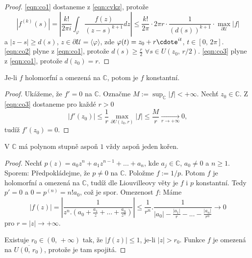 \begin{proof}
\cref{eqn:co1} dostaneme z \cref{eqn:cvkz}, protože 
\[|f^{(k)}(s)|=
\left\lvert\frac{k!}{2\pi{i}}\int_\varphi{\frac{f(z)}{(z-s)^{k+1}}}dz\right\lvert\leq
\frac{k!}{2\pi}\cdot 2\pi{r}\cdot\frac{1}{(d(s))^{k+1}}\cdot \max_{\partial\mathcal{U}}{|f|}\]
a $|z-s|\geq d(s)$, $z\in\partial\mathcal{U}=\langle\varphi\rangle$, zde $\varphi(t)=z_0+r\cdote^{it}$, $t\in\left[0,\, 2\pi\right]$.\newline
\cref{eqn:co2} plyne z \cref{eqn:co1}, protože $d(s)\geq\frac{r}{2}$ $\forall{s\in{U(z_0,\, r/2)}}$.\newline
\cref{eqn:co3} plyne z \cref{eqn:co1}, protože $d(z_0)=r$. 
\end{proof}


\begin{theorem}[Liouville]
Je-li $f$ holomorfní  a omezená na $\mathbb{C}$, potom je $f$ konstantní.
\end{theorem}

\begin{proof}
Ukážeme, že $f'=0$ na $\mathbb{C}$. Označme $M:=\sup_\mathbb{C}{|f|}<+\infty$. Nechť $z_0\in\mathbb{C}$. Z \cref{eqn:co3} dostaneme pro každé $r>0$
\[|f'(z_0)|\leq
\frac{1}{r}\max_{\partial{U(z_0,r)}}{|f|}\leq
\frac{M}{r}\underset{{r\to{+\infty}}}{\to}0,\]
tudíž $f'(z_0)=0$.
\end{proof}

\begin{consequence}
V $\mathbb{C}$ má polynom stupně aspoň $1$ vždy aspoň jeden kořen.
\end{consequence}

\begin{proof}
Nechť $p(z)={a_0}{z^n}+{a_1}{z^{n-1}}+...+{a_n}$, kde $a_j\in\mathbb{C}$, $a_0\neq{0}$ a $n\geq{1}$.\newline
Sporem: Předpokládejme, že $p\neq{0}$ na $\mathbb{C}$. Položme $f:=1/p$. Potom $f$ je holomorfní a omezená na $\mathbb{C}$, tudíž dle Liouvilleovy věty je $f$ i $p$ konstantní. Tedy $p'=0$ a $0=p^{(n)}=n!{a_0}$, což je spor.\newline
Omezenost $f$: Máme
\[|f(z)|=\left\lvert\frac{1}{z^n.\left(a_0+\frac{a_1}{z}+...+\frac{a_n}{z^n}\right)}\right\lvert\leq
\frac{1}{r^n}.\frac{1}{|a_0|-\frac{|a_1|}{r}-...-\frac{|a_n|}{r^n}}\longrightarrow 0\]
pro $r=|z|\to+\infty$.

Existuje $r_0\in(0,\, +\infty)$ tak, že $|f(z)|\leq{1}$, je-li $|z|>r_0$. Funkce $f$ je omezená na $\overline{U(0,\, r_0)}$, protože je tam spojitá.
\end{proof}

